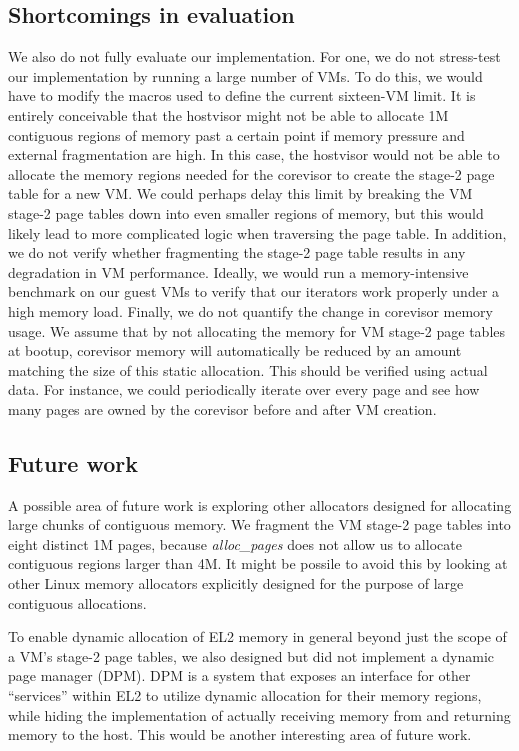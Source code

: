 \subsection{Shortcomings in evaluation}

We also do not fully evaluate our implementation. For one, we do not stress-test our implementation by running a large number
of VMs. To do this, we would have to modify the macros used to define the current
sixteen-VM limit. It is entirely conceivable that the hostvisor might not be able
to allocate 1M contiguous regions of memory past a certain point if memory
pressure and external fragmentation are high. In this case, the hostvisor would
not be able to allocate the memory regions needed for the corevisor to create
the stage-2 page table for a new VM. We could perhaps delay this limit by breaking
the VM stage-2 page tables down into even smaller regions of memory, but this would
likely lead to more complicated logic when traversing the page table. In addition, we do not verify whether fragmenting the stage-2 page table results
in any degradation in VM performance. Ideally, we would run a memory-intensive
benchmark on our guest VMs to verify that our iterators work properly under a
high memory load. Finally, we do not quantify the change in corevisor memory usage.
We assume that by not allocating the memory for VM stage-2 page tables at bootup,
corevisor memory will automatically be reduced by an amount matching the
size of this static allocation. This should be verified using actual data. For
instance, we could periodically iterate over every page and see how many pages
are owned by the corevisor before and after VM creation.

\subsection{Future work}

A possible area of future work is exploring other allocators designed for
allocating large chunks of contiguous memory. We fragment the VM stage-2 page tables
into eight distinct 1M pages, because \textit{alloc\_pages} does not allow us
to allocate contiguous regions larger than 4M. It might be possile to avoid this
by looking at other Linux memory allocators explicitly designed for the purpose
of large contiguous allocations.

To enable dynamic allocation of EL2 memory in general beyond just the scope of
a VM's stage-2 page tables, we also designed but did not implement
a dynamic page manager (DPM). DPM is a system that exposes an interface for other ``services'' within EL2 to
utilize dynamic allocation for their memory regions, while hiding the implementation of actually receiving memory from
and returning memory to the host. This would be another interesting area of future work.

